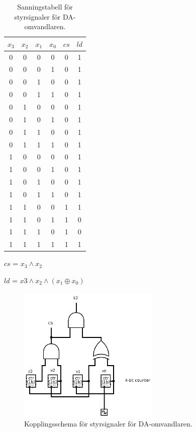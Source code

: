 \documentclass[a4paper,10pt]{article}
\begin{document}
\begin{table}[h]
\centering
\begin{tabular}{|c c c c || c c |}
\hline
$x_3$ & $x_2$ & $x_1$ & $x_0$ & $cs$ & $ld$ \\\hline
0 & 0 & 0 & 0 & 0 & 1 \\
0 & 0 & 0 & 1 & 0 & 1 \\
0 & 0 & 1 & 0 & 0 & 1 \\
0 & 0 & 1 & 1 & 0 & 1 \\
0 & 1 & 0 & 0 & 0 & 1 \\
0 & 1 & 0 & 1 & 0 & 1 \\
0 & 1 & 1 & 0 & 0 & 1 \\
0 & 1 & 1 & 1 & 0 & 1 \\
1 & 0 & 0 & 0 & 0 & 1 \\
1 & 0 & 0 & 1 & 0 & 1 \\
1 & 0 & 1 & 0 & 0 & 1 \\
1 & 0 & 1 & 1 & 0 & 1 \\
1 & 1 & 0 & 0 & 1 & 1 \\
1 & 1 & 0 & 1 & 1 & 0 \\
1 & 1 & 1 & 0 & 1 & 0 \\
1 & 1 & 1 & 1 & 1 & 1 \\
\hline
\end{tabular}

$cs$ = $x_3 \wedge x_2$

$ld$ = $x3 \wedge x_2 \wedge (x_1 \oplus x_0)$

\caption{Sanningstabell för styrsignaler för DA-omvandlaren.}
\label{tab:dac}
\end{table}

\begin{figure}[h]
\centering
\includegraphics[width=0.6\textwidth]{daccircuit.png}
\caption{Kopplingsschema för styrsignaler för DA-omvandlaren.}
\label{fig:daccircuit}
\end{figure}
\end{document}
